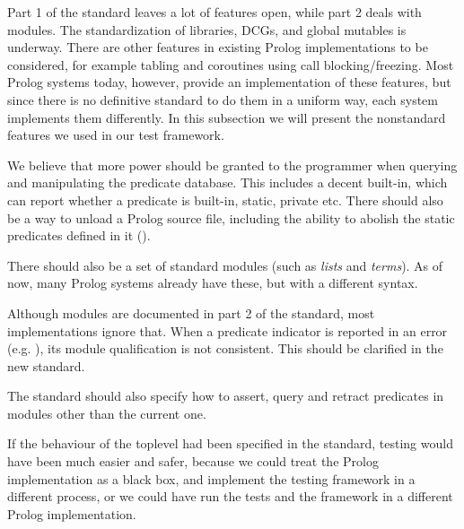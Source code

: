 \documentclass[draft]{llncs}%
\begin{document}
Part 1 of the standard \cite{isoprolog95} leaves a lot of features open,
while part 2 deals with modules.  The standardization of libraries,
DCGs, and global mutables is underway. There are other features in existing
Prolog implementations to be considered, for example tabling and coroutines
using call blocking/freezing. Most Prolog systems today, however, provide an
implementation of these features, but since there is no definitive standard
to do them in a uniform way, each system implements them differently. In this
subsection we will present the nonstandard features we used in our test
framework.


We believe that
more power should be granted to the programmer when querying and
manipulating the predicate database. This includes a decent
 built-in, which can report
whether a predicate is built-in, static, private etc. There should also be a
way to unload a Prolog source file, including the ability to
abolish the static predicates defined in it
().

There should also be a set of standard modules
(such as \emph{lists} and \emph{terms}). As of now, many Prolog
systems already have these, but with a different syntax.

Although modules are documented in part 2 of the standard,
most implementations ignore that.
When a predicate indicator is reported in an error
(e.g.  ), its module qualification is not
consistent. This should be clarified in the new standard.

The standard should also specify how to assert, query and retract predicates
in modules other than the current one.

If the behaviour of the toplevel had been specified in the standard, testing
would have been much easier and safer, because we could treat the Prolog
implementation as a black box, and implement the testing framework in a
different process, or we could have run the tests and the framework in a
different Prolog implementation.
\end{document}
